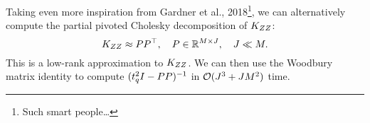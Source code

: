 Taking even more inspiration from Gardner et al., 2018\footnote{
  Such smart people\ldots
}, we can alternatively compute the partial pivoted Cholesky decomposition of $K_{ZZ}$:
%
\begin{equation}
  K_{ZZ} \approx P P^\top, \quad P \in \mathbb{R}^{M \times J}, \quad J \ll M.
  \label{eqn:partial_pc}
\end{equation}
%
This is a low-rank approximation to $K_{ZZ}$.
We can then use the Woodbury matrix identity to compute $( t_q^2 I - P P )^{-1}$ in $\bigo{ J^3 + J M^2 }$ time.




